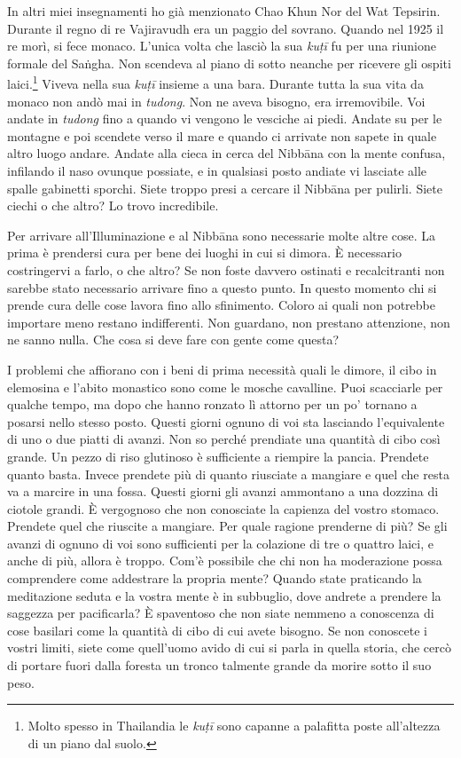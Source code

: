 In altri miei insegnamenti ho già menzionato Chao Khun Nor del Wat
Tepsirin. Durante il regno di re Vajiravudh era un paggio del sovrano.
Quando nel 1925 il re morì, si fece monaco. L'unica volta che lasciò la
sua \emph{kuṭī} fu per una riunione formale del Saṅgha. Non scendeva al
piano di sotto neanche per ricevere gli ospiti laici.\footnote{Molto
  spesso in Thailandia le \emph{kuṭī} sono capanne a palafitta poste
  all'altezza di un piano dal suolo.} Viveva nella sua \emph{kuṭī}
insieme a una bara. Durante tutta la sua vita da monaco non andò mai in
\emph{tudong}. Non ne aveva bisogno, era irremovibile. Voi andate in
\emph{tudong} fino a quando vi vengono le vesciche ai piedi. Andate su
per le montagne e poi scendete verso il mare e quando ci arrivate non
sapete in quale altro luogo andare. Andate alla cieca in cerca del
Nibbāna con la mente confusa, infilando il naso ovunque possiate,
e in qualsiasi posto andiate vi lasciate alle spalle gabinetti sporchi.
Siete troppo presi a cercare il Nibbāna per pulirli. Siete ciechi
o che altro? Lo trovo incredibile.

Per arrivare all'Illuminazione e al Nibbāna sono necessarie molte
altre cose. La prima è prendersi cura per bene dei luoghi in cui si
dimora. È necessario costringervi a farlo, o che altro? Se non foste
davvero ostinati e recalcitranti non sarebbe stato necessario arrivare
fino a questo punto. In questo momento chi si prende cura delle cose
lavora fino allo sfinimento. Coloro ai quali non potrebbe importare meno
restano indifferenti. Non guardano, non prestano attenzione, non ne
sanno nulla. Che cosa si deve fare con gente come questa?

I problemi che affiorano con i beni di prima necessità quali le dimore,
il cibo in elemosina e l'abito monastico sono come le mosche cavalline.
Puoi scacciarle per qualche tempo, ma dopo che hanno ronzato lì attorno
per un po' tornano a posarsi nello stesso posto. Questi giorni ognuno di
voi sta lasciando l'equivalente di uno o due piatti di avanzi. Non so
perché prendiate una quantità di cibo così grande. Un pezzo di riso
glutinoso è sufficiente a riempire la pancia. Prendete quanto basta.
Invece prendete più di quanto riusciate a mangiare e quel che resta va a
marcire in una fossa. Questi giorni gli avanzi ammontano a una dozzina
di ciotole grandi. È vergognoso che non conosciate la capienza del
vostro stomaco. Prendete quel che riuscite a mangiare. Per quale ragione
prenderne di più? Se gli avanzi di ognuno di voi sono sufficienti per la
colazione di tre o quattro laici, e anche di più, allora è troppo. Com'è
possibile che chi non ha moderazione possa comprendere come addestrare
la propria mente? Quando state praticando la meditazione seduta e la
vostra mente è in subbuglio, dove andrete a prendere la saggezza per
pacificarla? È spaventoso che non siate nemmeno a conoscenza di cose
basilari come la quantità di cibo di cui avete bisogno. Se non conoscete
i vostri limiti, siete come quell'uomo avido di cui si parla in quella
storia, che cercò di portare fuori dalla foresta un tronco talmente
grande da morire sotto il suo peso.

